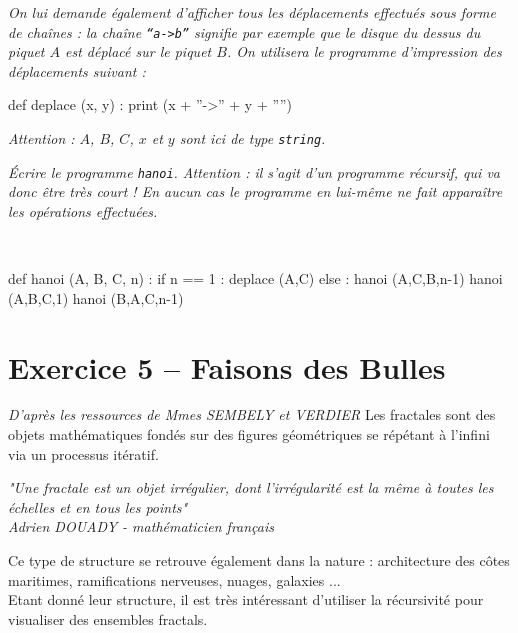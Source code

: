 \textit{On lui demande également d'afficher tous les déplacements effectués sous forme de chaînes : la chaîne 
\texttt{``a->b''} signifie par exemple que le disque du dessus du piquet $A$ est déplacé sur le piquet $B$. On 
utilisera le programme 
d'impression des déplacements suivant :\\}

\begin{py}
\begin{python}
def deplace (x, y) :
    print (x + ''->'' + y + ''\n'')
\end{python}
\end{py}

\textit{Attention : $A$, $B$, $C$, $x$ et $y$ sont ici de type \texttt{string}.\\}

\textit{Écrire le programme \texttt{hanoi}. Attention : il s'agit d'un programme récursif, qui va donc être très court 
! En 
aucun cas le programme en lui-même ne fait apparaître les opérations effectuées.}

\ifprof
\begin{corrige} ~\\

\begin{py}
\begin{python}
def hanoi (A, B, C, n) :
    if n == 1 :
	deplace (A,C)
    else :
	hanoi (A,C,B,n-1)
	hanoi (A,B,C,1)
	hanoi (B,A,C,n-1)
\end{python}
\end{py}

\end{corrige}
\else
\fi

\section*{Exercice 5 -- Faisons des Bulles}
\setcounter{subparagraph}{0}

\ifprof
\else
\textit{ D'après les ressources de Mmes SEMBELY et VERDIER}
Les fractales sont des objets mathématiques fondés sur des figures géométriques se répétant à l'infini via un processus 
itératif.
\begin{center}
\textit{ "Une fractale est un objet irrégulier, dont l'irrégularité est la même à toutes les échelles et en tous les 
points"
\\
Adrien DOUADY - mathématicien français}
\end{center}
Ce type de structure se retrouve également dans la nature : architecture des côtes maritimes, ramifications nerveuses, 
nuages, galaxies ...
\\
Etant donné leur structure, il est très intéressant d'utiliser la récursivité pour visualiser des ensembles fractals.
\\

